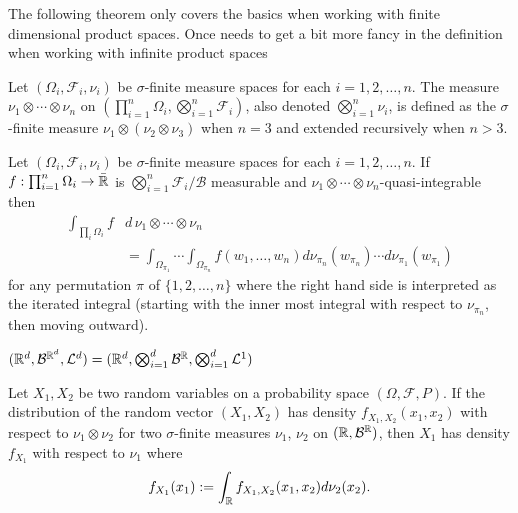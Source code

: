 The following theorem only covers the basics when working with finite dimensional product spaces. Once needs to get a bit more fancy in the definition when working with infinite product spaces

\begin{definition}
\label{def: Product measure of higher order}
Let $(\Omega_i,\mathcal F_i,\nu_i)$ be $\sigma$-finite measure spaces for each $i=1,2,\ldots, n$. The measure $\nu_1\otimes \cdots \otimes \nu_n$ on $(\prod_{i=1}^n \Omega_i, \bigotimes_{i=1}^n \mathcal F_i)$, also denoted $\bigotimes_{i=1}^n  \nu_i$, is defined as the $\sigma$-finite measure $\nu_1\otimes (\nu_2\otimes\nu_3)$ when $n=3$ and extended recursively when $n>3$.
\end{definition}





\begin{theorem}
Let $(\Omega_i,\mathcal F_i,\nu_i)$ be $\sigma$-finite measure spaces for each $i=1,2,\ldots, n$.
If $f:\prod_{i=1}^n \Omega_i\rightarrow \bar{\Bbb R}$ is $\bigotimes_{i=1}^n \mathcal F_i/\mathcal B$ measurable and $\nu_1\!\!\otimes \cdots \otimes \!\nu_n$-quasi-integrable then
\begin{align*}
 \int_{\prod_{i}\!\Omega_i}\!\!\!f &d\,\nu_1 \!\otimes\cdots\otimes\!\nu_n \\
 &= \int_{\Omega_{\pi_1}}\!\!\!\!\!\!\!\cdots\! \int_{\Omega_{\pi_n}}\!\!\!\! f(w_1,\ldots, w_n) d\nu_{\pi_n}(w_{\pi_n})\cdots d\nu_{\pi_1}(w_{\pi_1})
\end{align*}
for any permutation $\pi$ of $\{1,2,\ldots, n \}$ where the right hand side is interpreted as the iterated integral (starting with the inner most integral with respect to $\nu_{\pi_n}$, then moving outward).
\end{theorem}


\begin{corollary}
$(\Bbb R^d, \mathcal B^{{\Bbb R}^d}, \mathcal L^d ) = (\Bbb R^d, \bigotimes_{i=1}^d \mathcal B^{{\Bbb R}}, \bigotimes_{i=1}^d \mathcal L^1)$
\end{corollary}



\begin{corollary}
\label{cor: integrate out the joint}
Let $X_1, X_2$ be two random variables on a probability space $(\Omega, \mathcal F, P)$. If the distribution of the random vector $(X_1,X_2)$ has density $f_{X_1, X_2}(x_1,x_2)$ with respect to $\nu_1\otimes \nu_2$ for two $\sigma$-finite measures $\nu_1$, $\nu_2$ on $(\Bbb R, \mathcal B^{\Bbb R})$, then $X_1$ has density $f_{X_1}$ with respect to $\nu_1$ where
\[ f_{X_1}(x_1):= \int_{\Bbb R}  f_{X_1, X_2}(x_1,x_2) d\nu_2(x_2) . \]
\end{corollary}



